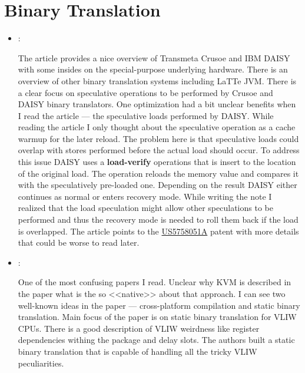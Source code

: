 \section*{Binary Translation}
\begin{itemize}
    \item \cite{Altman:BT-Future:2001}:

    The article provides a nice overview of Transmeta Crusoe and IBM DAISY with some insides on the special-purpose underlying hardware. There is an overview of other binary translation systems including LaTTe JVM. There is a clear focus on speculative operations to be performed by Crusoe and DAISY binary translators. One optimization had a bit unclear benefits when I read the article --- the speculative loads performed by DAISY. While reading the article I only thought about the speculative operation as a cache warmup for the later reload. The problem here is that speculative loads could overlap with stores performed before the actual load should occur. To address this issue DAISY uses a \textbf{load-verify} operations that is insert to the location of the original load. The operation reloads the memory value and compares it with the speculatively pre-loaded one. Depending on the result DAISY either continues as normal or enters recovery mode. While writing the note I realized that the load speculation might allow other speculations to be performed and thus the recovery mode is needed to roll them back if the load is overlapped. The article points to the \href{https://patents.google.com/patent/US5758051A}{US5758051A} patent with more details that could be worse to read later.

    \item \cite{Hamayun:StaticBT-VLIW:2013}:

    One of the most confusing papers I read. Unclear why KVM is described in the paper what is the so <<native>> about that approach. I can see two well-known ideas in the paper --- cross-platform compilation and static binary translation. Main focus of the paper is on static binary translation for VLIW CPUs. There is a good description of VLIW weirdness like register dependencies withing the package and delay slots. The authors built a static binary translation that is capable of handling all the tricky VLIW peculiarities.
\end{itemize}

